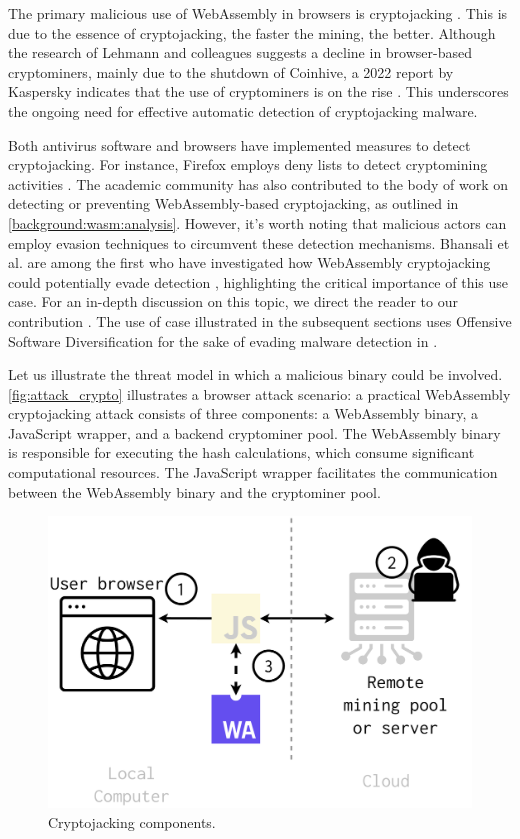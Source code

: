 
The primary malicious use of WebAssembly in browsers is cryptojacking \cite{musch2019new}. 
This is due to the essence of cryptojacking, the faster the mining, the better. 
Although the research of Lehmann and colleagues \cite{Hilbig2021AnES} suggests a decline in browser-based cryptominers, mainly due to the shutdown of Coinhive, a 2022 report by Kaspersky indicates that the use of cryptominers is on the rise \cite{kasperksy}. 
This underscores the ongoing need for effective automatic detection of cryptojacking malware.


Both antivirus software and browsers have implemented measures to detect cryptojacking. For instance, Firefox employs deny lists to detect cryptomining activities \cite{firefoxcrypto}. 
The academic community has also contributed to the body of work on detecting or preventing WebAssembly-based cryptojacking, as outlined in \autoref{background:wasm:analysis}. 
However, it's worth noting that malicious actors can employ evasion techniques to circumvent these detection mechanisms. 
Bhansali et al. are among the first who have investigated how WebAssembly cryptojacking could potentially evade detection \cite{10.1145/3507657.3528560}, highlighting the critical importance of this use case. 
For an in-depth discussion on this topic, we direct the reader to our contribution \cite{EVASION}.
The use of case illustrated in the subsequent sections uses Offensive Software Diversification for the sake of evading malware detection in \Wasm. 



Let us illustrate the threat model in which a malicious \wasm binary could be involved.
\autoref{fig:attack_crypto} illustrates a browser attack scenario:
a practical WebAssembly cryptojacking attack consists of three components: a WebAssembly binary, a JavaScript wrapper, and a backend cryptominer pool. 
The WebAssembly binary is responsible for executing the hash calculations, which consume significant computational resources. 
The JavaScript wrapper facilitates the communication between the WebAssembly binary and the cryptominer pool.

\begin{figure}[h]
    \centering
    \includegraphics[width=0.6\linewidth]{figures/attack_crypto.pdf}
    \caption{Cryptojacking components.}
    \label{fig:attack_crypto}
\end{figure}

